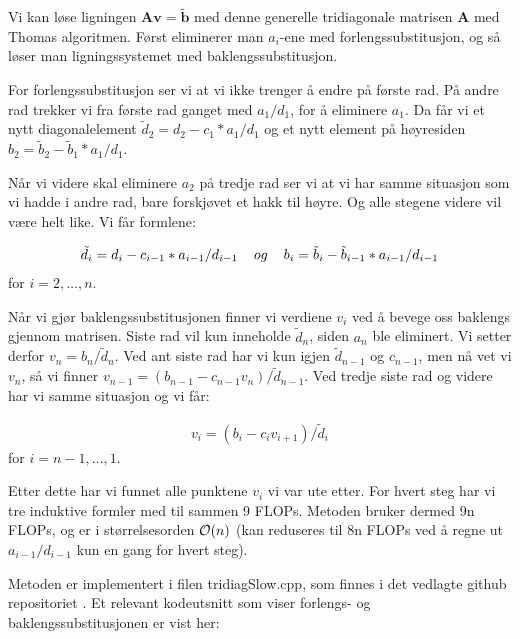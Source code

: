 \documentclass[reprint,english,notitlepage]{revtex4-1}
\begin{document}
	Vi kan løse ligningen $\mathbf{A}\mathbf{v} = \tilde{\mathbf{b}}$ med denne generelle tridiagonale matrisen $\mathbf{A}$ med Thomas algoritmen. Først eliminerer man $a_i$-ene med forlengssubstitusjon, og så løser man ligningssystemet med baklengssubstitusjon.
	
	For forlengssubstitusjon ser vi at vi ikke trenger å endre på første rad. På andre rad trekker vi fra første rad ganget med $a_1/d_1$, for å eliminere $a_1$. Da får vi et nytt diagonalelement $\tilde{d}_2 = d_2 - c_1 * a_1/d_1$ og et nytt element på høyresiden $b_2 = \tilde{b}_2 - \tilde{b}_1 * a_1/d_1$.
	
	Når vi videre skal eliminere $a_2$ på tredje rad ser vi at vi har samme situasjon som vi hadde i andre rad, bare forskjøvet et hakk til høyre. Og alle stegene videre vil være helt like. Vi får formlene:
	
	\begin{equation*}
	\begin{aligned}
	\tilde{d}_i = d_i - c_{i-1} * a_{i-1}/d_{i-1} \hspace{0.4cm} og \hspace{0.4cm} b_i = \tilde{b}_i - \tilde{b}_{i-1} * a_{i-1}/d_{i-1}
	\end{aligned}
	\end{equation*}
	for $i=2,\dots, n$.
	
	Når vi gjør baklengssubstitusjonen finner vi verdiene $v_i$ ved å bevege oss baklengs gjennom matrisen. Siste rad vil kun inneholde $\tilde{d}_n$, siden $a_n$ ble eliminert. Vi setter derfor $v_n = b_n / \tilde{d}_n$. Ved ant siste rad har vi kun igjen $\tilde{d}_{n-1}$ og $c_{n-1}$, men nå vet vi $v_n$, så vi finner $v_{n-1} = (b_{n-1} - c_{n-1}v_{n}) / \tilde{d}_{n-1}$. Ved tredje siste rad og videre har vi samme situasjon og vi får:
	
	\begin{equation*}
	\begin{aligned}
	v_{i} = (b_{i} - c_{i}v_{i+1}) / \tilde{d}_{i}
	\end{aligned}
	\end{equation*}
	for $i=n-1,\dots, 1$.
	
	Etter dette har vi funnet alle punktene $v_i$ vi var ute etter. For hvert steg har vi tre induktive formler med til sammen 9 FLOPs. Metoden bruker dermed 9n FLOPs, og er i størrelsesorden $\order{n}$ (kan reduseres til 8n FLOPs ved å regne ut $a_{i-1}/d_{i-1}$ kun en gang for hvert steg).
	
	Metoden er implementert i filen tridiagSlow.cpp, som finnes i det vedlagte github repositoriet \cite{myRepo}. Et relevant kodeutsnitt som viser forlengs- og baklengssubstitusjonen er vist her:
	
\end{document}
